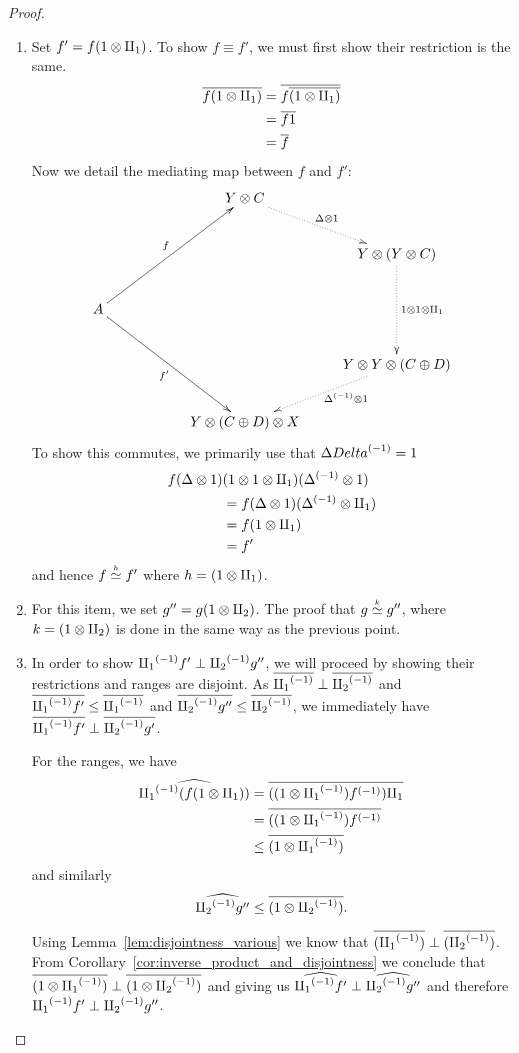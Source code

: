 \begin{proof}
  \prepprooflist
  \begin{enumerate}[{(}i{)}]
  \item Set $f' = f(1\otimes\amalg_{1})$.
    To show $f\equiv f'$, we must first show their restriction is the same.
    \begin{align*}
      \overline{f(1\otimes\amalg_{1})} &= \overline{f\overline{(1\otimes\amalg_{1})}}\\
      & = \overline{f 1}\\
      &=  \overline{f}
    \end{align*}
    Now we detail the mediating map between $f$ and $f'$:
    \[
    \xymatrix @C=25pt @R=25pt{
      & & Y \* C \ar@{.>}[dr]^{\Delta\* 1}\\
      & & & Y \* (Y\* C) \ar@{.>}[dd]^{1\*1\*\cpa}\\
      A \ar[uurr]^f \ar[ddrr]_{f'} \\
      & & & Y \* Y\*(C\+ D) \ar@{.>}[dl]^(.4){\inv{\Delta}\* 1}\\
      && Y\*(C\+ D)\*X
    }
    \]
  To show this commutes, we primarily use that $\Delta{Delta}^{(-1)} = 1$
  \begin{align*}
    f(\Delta\otimes1)&(1\otimes1\otimes\amalg_{1})({\Delta}^{(-1)}\otimes1) \\
    &= f(\Delta\otimes1)({\Delta}^{(-1)} \otimes \amalg_{1})\\
    &= f(1 \otimes \amalg_{1})\\
    &= f'
  \end{align*}
  and hence $f\overset{\scriptscriptstyle h}{\simeq}f'$ where $h = (1\otimes\amalg_{1})$.
  \item For this item, we set $g'' = g(1\otimes\amalg_{2})$. The proof that $g\overset{\scriptscriptstyle k}{\simeq}g''$, where
    $k = (1\otimes\amalg_{2})$ is done in the same way as the previous point.
  \item In order to show  ${\amalg_{1}}^{(-1)} f' \perp {\amalg_{2}}^{(-1)} g''$, we will proceed by showing their restrictions
    and ranges are disjoint.
    As $\overline{{\amalg_{1}}^{(-1)}} \perp \overline{{\amalg_{2}}^{(-1)}}$ and $\overline{{\amalg_{1}}^{(-1)}f'} \le \overline{{\amalg_{1}}^{(-1)}}$ and
    $\overline{{\amalg_{2}}^{(-1)}g''} \le \overline{{\amalg_{2}}^{(-1)}}$, we immediately have
    $\overline{{\amalg_{1}}^{(-1)}f'} \perp \overline{{\amalg_{2}}^{(-1)}g'}$.

    For the ranges, we have
    \begin{align*}
      \widehat{{\amalg_{1}}^{(-1)} (f (1\otimes\amalg_{1}))} &=
      \overline{((1\otimes{\amalg_{1}}^{(-1)}){f}^{(-1)})\amalg_{1}}\\
      &= \overline{((1\otimes{\amalg_{1}}^{(-1)}){f}^{(-1)}}\\
      &\le \overline{(1\otimes{\amalg_{1}}^{(-1)})}
    \end{align*}
    and similarly
    \[
      \widehat{{\amalg_{2}}^{(-1)} g''} \le \overline{(1\otimes{\amalg_{2}}^{(-1)})}.
    \]

    Using Lemma~\ref{lem:disjointness_various}
    we know that $\overline{({\amalg_{1}}^{(-1)})}\perp \overline{({\amalg_{2}}^{(-1)})}$. From
    Corollary~\ref{cor:inverse_product_and_disjointness}
    we conclude that $\overline{(1\otimes{\amalg_{1}}^{(-1)})}\perp \overline{(1\otimes{\amalg_{2}}^{(-1)})}$ and giving us
    $\widehat{{\amalg_{1}}^{(-1)}f'} \perp \widehat{{\amalg_{2}}^{(-1)}g''}$ and therefore ${\amalg_{1}}^{(-1)}f' \perp {\amalg_{2}}^{(-1)}g''$.
  \end{enumerate}
\end{proof}
